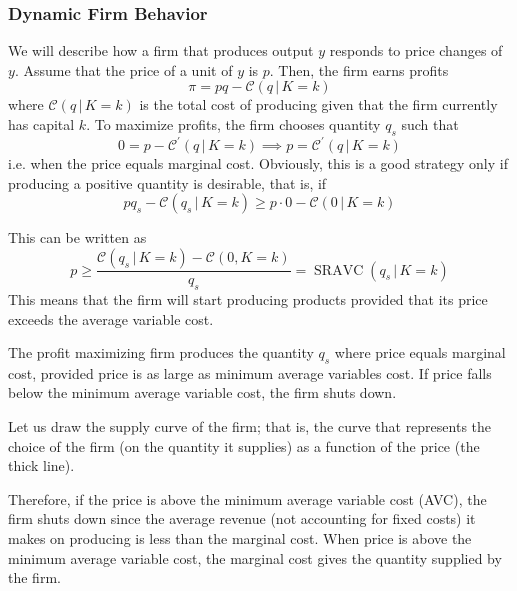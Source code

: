 \documentclass{article}
\DeclareMathOperator{\SRAVC}{SRAVC}
\begin{document}
    \subsubsection{Dynamic Firm Behavior}

      We will describe how a firm that produces output $y$ responds to price changes of $y$. Assume that the price of a unit of $y$ is $p$. Then, the firm earns profits 
      \begin{equation}
        \pi = p q - \mathcal{C}(q\,|\,K = k)
      \end{equation}
      where $\mathcal{C}(q\,|\,K=k)$ is the total cost of producing given that the firm currently has capital $k$. To maximize profits, the firm chooses quantity $q_s$ such that 
      \begin{equation}
        0 = p - \mathcal{C}^\prime (q\,|\,K = k) \implies p = \mathcal{C}^\prime (q\,|\,K = k)
      \end{equation}
      i.e. when the price equals marginal cost. Obviously, this is a good strategy only if producing a positive quantity is desirable, that is, if 
      \begin{equation}
        p q_s - \mathcal{C}(q_s\,|\,K=k) \geq p \cdot 0 - \mathcal{C} (0\,|\,K=k)
      \end{equation}
       
      This can be written as
      \begin{equation}
        p \geq \frac{\mathcal{C}(q_s \,|\, K=k) - \mathcal{C}(0, K=k)}{q_s} = \SRAVC(q_s\,|\,K=k)
      \end{equation}
      This means that the firm will start producing products provided that its price exceeds the average variable cost. 

      \begin{theorem}
        \label{thm:profit-maximization-at-marginal-cost}
        The profit maximizing firm produces the quantity $q_s$ where price equals marginal cost, provided price is as large as minimum average variables cost. If price falls below the minimum average variable cost, the firm shuts down. 
      \end{theorem}

      Let us draw the supply curve of the firm; that is, the curve that represents the choice of the firm (on the quantity it supplies) as a function of the price (the thick line).
      \begin{center}
      \end{center}
      Therefore, if the price is above the minimum average variable cost (AVC), the firm shuts down since the average revenue (not accounting for fixed costs) it makes on producing is less than the marginal cost. When price is above the minimum average variable cost, the marginal cost gives the quantity supplied by the firm. 
\end{document}
